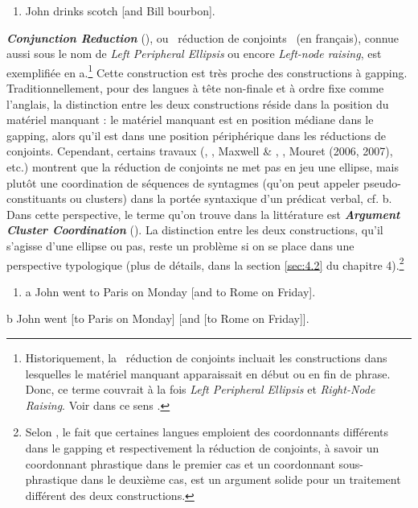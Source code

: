 \begin{enumerate}
\item \label{bkm:Ref302724139}John drinks scotch [and Bill bourbon].  


\end{enumerate}
\textbf{\textit{Conjunction Reduction} }(\citet{Jackendoff1971}), ou {\guillemotleft}~réduction de conjoints~{\guillemotright} (en français), connue aussi sous le nom de \textit{Left Peripheral Ellipsis} ou encore \textit{Left-node raising}, est exemplifiée en a.\footnote{Historiquement, la {\guillemotleft}~réduction de conjoints {\guillemotright} incluait les constructions dans lesquelles le matériel manquant apparaissait en début ou en fin de phrase. Donc, ce terme couvrait à la fois \textit{Left Peripheral Ellipsis} et \textit{Right-Node Raising}. Voir dans ce sens \citet{Jackendoff1971}.} Cette construction est très proche des constructions à gapping. Traditionnellement, pour des langues à tête non-finale et à ordre fixe comme l'anglais, la distinction entre les deux constructions réside dans la position du matériel manquant : le matériel manquant est en position médiane dans le gapping, alors qu'il est dans une position périphérique dans les réductions de conjoints. Cependant, certains travaux (\citet{Dowty1988}, \citet{Hudson1988}, Maxwell \& \citet{Manning1996}, \citet{Steedman2000}, Mouret (2006, 2007), etc.) montrent que la réduction de conjoints ne met pas en jeu une ellipse, mais plutôt une coordination de séquences de syntagmes (qu'on peut appeler pseudo-constituants ou clusters) dans la portée syntaxique d'un prédicat verbal, cf. b. Dans cette perspective, le terme qu'on trouve dans la littérature est \textbf{\textit{Argument Cluster Coordination}} (\citet{Steedman2000}). La distinction entre les deux constructions, qu'il s'agisse d'une ellipse ou pas, reste un problème si on se place dans une perspective typologique (plus de détails, dans la section \ref{sec:4.2} du chapitre 4).\footnote{Selon \citet{Haspelmath2007}, le fait que certaines langues emploient des coordonnants différents dans le gapping et respectivement la réduction de conjoints, à savoir un coordonnant phrastique dans le premier cas et un coordonnant sous-phrastique dans le deuxième cas, est un argument solide pour un traitement différent des deux constructions.}  


\begin{enumerate}
\item \label{bkm:Ref302724517}a  John went to Paris on Monday [and to Rome on Friday]. 


\end{enumerate}
  b  John went [to Paris on Monday] [and [to Rome on Friday]].  

